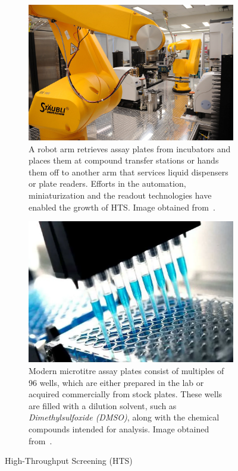 \begin{figure}[htbp]
    \centering
    \begin{subfigure}[b]{0.48\textwidth}
        \centering
        \includegraphics[width=\textwidth]{figures/hts_robot.png}
        \caption{A robot arm retrieves assay plates from incubators and places them at compound transfer stations or hands them off to another arm that services liquid dispensers or plate readers. Efforts in the automation, miniaturization and the readout technologies have enabled the growth of HTS. Image obtained from~\cite{hts_robot}.}
    \label{fig:hts_robot}
    \end{subfigure}
    \hfill
    \begin{subfigure}[b]{0.48\textwidth}
        \centering
        \includegraphics[width=\textwidth]{figures/hts.png}
        \caption{Modern microtitre assay plates consist of multiples of 96 wells, which are either prepared in the lab or acquired commercially from stock plates. These wells are filled with a dilution solvent, such as \emph{Dimethylsulfoxide (DMSO)}, along with the chemical compounds intended for analysis. Image obtained from~\cite{hts_plates}.}
        \label{fig:hts_plates}
    \end{subfigure}
    \caption{High-Throughput Screening (HTS)}
    \label{fig:hts}
\end{figure}


